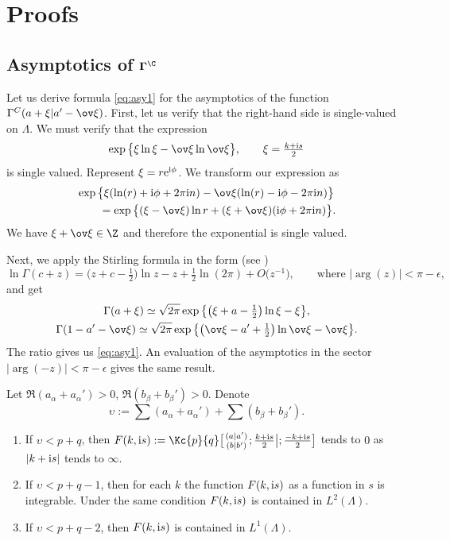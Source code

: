 \section{Proofs}\label{section2}

\subsection[Asymptotics of $\Gamma^\C$]{Asymptotics of $\boldsymbol{\Gamma^\C}$}\label{ss:asy}
Let us derive formula \eqref{eq:asy1} for the asymptotics of the function $\Gamma^C(a+\xi|a'-\ov \xi)$.
First, let us verify that the right-hand side is single-valued
on $\Lambda$.
We must verify that the expression
\[
\exp\big\{ \xi\ln\xi - \ov\xi\ln\ov\xi\big\}, \qquad \xi=\tfrac{k+{\rm i}s}2
\]
is single valued.
Represent $\xi=r {\rm e}^{{\rm i}\phi}$. We transform our expression as
\begin{gather*}
\exp\big\{\xi(\ln(r)+{\rm i}\phi+2\pi {\rm i} n)-
\ov \xi(\ln(r)-{\rm i}\phi-2\pi {\rm i} n) \big\} \\
\qquad{}=\exp\big\{(\xi-\ov\xi) \ln r +(\xi+\ov\xi)({\rm i}\phi+2\pi {\rm i} n) \big\}.
\end{gather*}
We have $\xi+\ov\xi\in \Z$ and therefore the exponential is single valued.

Next, we apply the Stirling formula in the form
(see \cite[equation~(1.18(3))]{HTF1})
\[
\ln
\Gamma(c+z)=\big(z+c-\tfrac12\big)\ln z -z+\tfrac 12\ln(2\pi)+O\big(z^{-1}\big),
\qquad \text{where $|\arg (z)|<\pi-\epsilon$},
\]
and get
\begin{gather*}
\Gamma(a+\xi) \simeq \sqrt{2\pi}\exp
\big\{ \big(\xi+a-\tfrac12\big)\ln\xi-\xi \big\},\\
\Gamma(1-a'-\ov \xi) \simeq \sqrt{2\pi}\exp
\big\{ \big(\ov\xi-a'+\tfrac12\big)\ln\ov\xi-\ov\xi\big\}.
\end{gather*}
The ratio gives us \eqref{eq:asy1}.
An evaluation of the asymptotics in the sector $|\arg(-z)|<\pi-\epsilon$
gives the same result.

\begin{Corollary}\label{cor:L2}
Let $\Re(a_\alpha+a_\alpha')>0$, $\Re(b_\beta+b_\beta')>0$.
Denote
\[
\upsilon:=\sum (a_\alpha+a_\alpha')+\sum(b_\beta+b_\beta').
\]
\begin{enumerate}\itemsep=0pt
\item[$(a)$] If $\upsilon<p+q$, then $F(k,{\rm i}s):=
\Kc{p}{q}\big[\genfrac{}{}{0pt}{}{(a|a')}{(b|b')};\tfrac{k+{\rm i}s}{2}\bigl|;\tfrac{-k+{\rm i}s}{2}\big]$
tends to $0$ as $|k+{\rm i}s|$ tends to $\infty$.
\item[$(b)$]
If $\upsilon<p+q-1$, then for each $k$ the function $F(k,{\rm i}s)$ as a
function in $s$ is integrable.
Under the same condition $F(k,{\rm i}s)$ is contained in $L^2(\Lambda)$.
\item[$(c)$]
If $\upsilon<p+q-2$, then $F(k,{\rm i}s)$ is contained in $L^1(\Lambda)$.
\end{enumerate}
\end{Corollary}

